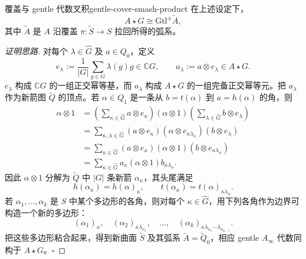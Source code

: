 \begin{theorem}{覆盖与 gentle 代数叉积}{gentle-cover-smash-product}
在上述设定下，
\[
  A\star G\cong\mathrm{Gtl}^{\pm}\widetilde A,
\]
其中 $\widetilde A$ 是 $A$ 沿覆盖 $\pi\colon\widetilde S\to S$ 拉回所得的弧系。
\end{theorem}
\begin{proof}[证明思路]
对每个 $\lambda\in\widehat G$ 及 $a\in Q_0$，定义
\[
  e_\lambda:=\frac1{|G|}\sum_{g\in G}\lambda(g)g\in\mathbb CG,
  \qquad a_\lambda:=a\otimes e_\lambda\in A\star G.
\]
$e_\lambda$ 构成 $\mathbb CG$ 的一组正交幂等基，而 $a_\lambda$ 构成 $A\star G$ 的一组完备正交幂等元。把 $a_\lambda$ 作为新箭图 $\widetilde Q$ 的顶点。若 $\alpha\in Q_1$ 是一条从 $b=t(\alpha)$ 到 $a=h(\alpha)$ 的角，则
\[
\begin{aligned}
  \alpha\otimes1
  &=\left(\sum_{\kappa\in\widehat G}a\otimes e_\kappa\right)
    (\alpha\otimes1)
    \left(\sum_{\lambda\in\widehat G}b\otimes e_\lambda\right)\\
  &=\sum_{\kappa,\lambda\in\widehat G}
    (a\otimes e_\kappa)(\alpha\otimes e_{\kappa\lambda_\alpha})
    (b\otimes e_\lambda)\\
  &=\sum_{\kappa\in\widehat G}
    (a\otimes e_\kappa)(\alpha\otimes1)(b\otimes e_{\kappa\lambda_\alpha})\\
  &=\sum_{\kappa\in\widehat G}a_\kappa(\alpha\otimes1)b_{\kappa\lambda_\alpha}.
\end{aligned}
\]
因此 $\alpha\otimes1$ 分解为 $\widetilde Q$ 中 $|G|$ 条新箭 $\alpha_\kappa$，其头尾满足
\[
  h(\alpha_\kappa)=h(\alpha)_\kappa,
  \qquad t(\alpha_\kappa)=t(\alpha)_{\kappa\lambda_\alpha}.
\]
若 $\alpha_1,\ldots,\alpha_k$ 是 $S$ 中某个多边形的各角，则对每个 $\kappa\in\widehat G$，用下列各角作为边界可构造一个新的多边形：
\[
  (\alpha_1)_\kappa,\quad
  (\alpha_2)_{\kappa\lambda_{\alpha_1}},\quad\ldots,\quad
  (\alpha_k)_{\kappa\lambda_{\alpha_1}\cdots\lambda_{\alpha_{k-1}}}.
\]
把这些多边形粘合起来，得到新曲面 $\widetilde S$ 及其弧系 $\widetilde A=\widetilde Q_0$，相应 gentle $A_\infty$ 代数同构于 $A\star G$。\hfill$\square$
\end{proof}

